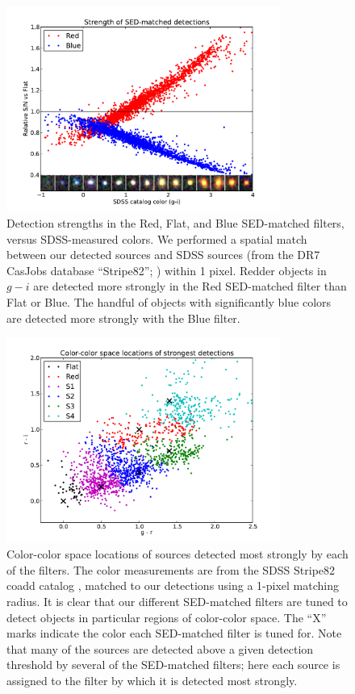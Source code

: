 \documentclass[letterpaper,preprint]{aastex}
\begin{document}
\begin{figure}
\begin{center}
\includegraphics[width=0.8\textwidth]{mdetect-11}
\caption{Detection strengths in the Red, Flat, and Blue SED-matched
  filters, versus SDSS-measured colors.  We performed a spatial match
  between our detected sources and SDSS sources (from the DR7 CasJobs
  database ``Stripe82''; \cite{annis}) within 1 pixel.  Redder objects
  in $g-i$ are detected more strongly in the Red SED-matched filter
  than Flat or Blue.  The handful of objects with significantly blue
  colors are detected more strongly with the Blue filter.
  \label{fig:redblue}}
\end{center}
\end{figure}


\begin{figure}
\begin{center}
\includegraphics[width=0.8\textwidth]{mdetect-17}
\caption{Color-color space locations of sources detected most strongly
  by each of the filters.
  The color measurements are from the SDSS
  Stripe82 coadd catalog \cite{annis}, matched to
  our detections using a 1-pixel matching radius.
  It is clear that
  our different SED-matched filters are tuned to detect objects in
  particular regions of color-color space.  The ``X'' marks indicate
  the color each SED-matched filter is tuned for.  Note that many of
  the sources are detected above a given detection threshold by
  several of the SED-matched filters; here each source is assigned to
  the filter by which it is detected most strongly.
  \label{fig:colorcolor}}
\end{center}
\end{figure}
\end{document}

